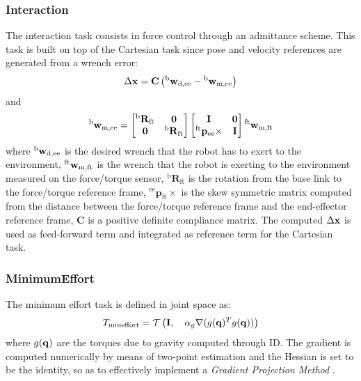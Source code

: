 \subsubsection{Interaction}
The interaction task consists in force control through an admittance scheme. This task is built on top of the Cartesian task since pose and velocity references are generated from a wrench error:
\begin{equation}
\Delta\mathbf{x} = \mathbf{C} \left({^\text{b}\mathbf{w}_\text{d,ee}} - {^\text{b}\mathbf{w}_\text{m,ee}} \right )
\end{equation}
and 
\begin{equation}
{^\text{b}\mathbf{w}_\text{m,ee}} = \begin{bmatrix}
{^\text{b}\mathbf{R}_\text{ft}} & \mathbf{0}\\ 
\mathbf{0} & {^\text{b}\mathbf{R}_\text{ft}} 
\end{bmatrix}
\begin{bmatrix}
\mathbf{I} & \mathbf{0}\\ 
{^\text{ft}\mathbf{p}_\text{ee}\times} & \mathbf{I} 
\end{bmatrix}{^\text{ft}\mathbf{w}_\text{m,ft}}
\end{equation}
where ${^\text{b}\mathbf{w}_\text{d,ee}}$ is the desired wrench that the robot has to exert to the environment, ${^\text{ft}\mathbf{w}_\text{m,ft}}$ is the wrench that the robot is exerting to the environment measured on the force/torque sensor, ${^\text{b}\mathbf{R}_\text{ft}}$ is the rotation from the base link to the force/torque reference frame, ${^\text{ee}\mathbf{p}_\text{ft}\times}$ is the skew symmetric matrix computed from the distance between the force/torque reference frame and the end-effector reference frame, $\mathbf{C}$ is a positive definite compliance matrix. The computed $\Delta\mathbf{x}$ is used as feed-forward term and integrated as reference term for the Cartesian task.

\subsubsection{MinimumEffort}
The minimum effort task is defined in joint space as:
\begin{equation}
T_\text{mineffort} = \mathcal{T} \left(\mathbf{I}, \quad \alpha_g\nabla(g(\mathbf{q})^Tg(\mathbf{q}))\right)
\end{equation}
where $g(\mathbf{q})$ are the torques due to gravity computed through ID. The gradient is computed numerically by means of two-point estimation and the Hessian is set to be the identity, so as to effectively implement a \emph{Gradient Projection Method} \cite{Rosen1960-gm}. 

